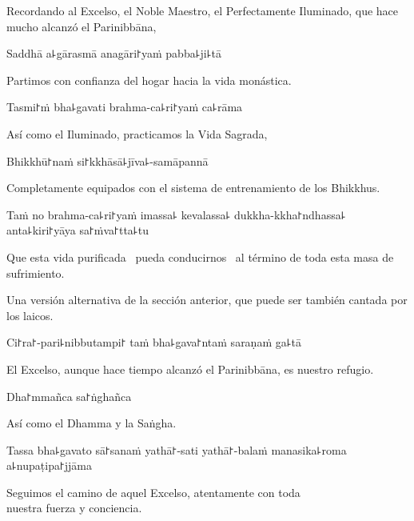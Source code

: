 \begin{english}
  Recordando al Excelso, el Noble Maestro, el Perfectamente Iluminado, que hace mucho alcanzó el Parinibbāna,
\end{english}

Saddhā a꜕gārasmā anagāri꜓yaṁ pabba꜕ji꜕tā

\begin{english}
  Partimos con confianza del hogar hacia la vida monástica.
\end{english}

Tasmi꜓ṁ bha꜕gavati brahma-ca꜕ri꜓yaṁ ca꜕rāma

\begin{english}
  Así como el Iluminado, practicamos la Vida Sagrada,
\end{english}

Bhikkhū꜓naṁ si꜓kkhāsā꜕jīva꜕-samāpannā

\begin{english}
  Completamente equipados con el sistema de entrenamiento de los Bhikkhus.
\end{english}

\clearpage

Taṁ no brahma-ca꜕ri꜓yaṁ imassa꜕ kevalassa꜕ dukkha-kkha꜓ndhassa꜕ anta꜕kiri꜓yāya sa꜓ṁva꜓tta꜕tu

\begin{english}
  Que esta vida purificada \pause\ pueda conducirnos \pause\ al término de toda esta masa de sufrimiento.
\end{english}

\begin{instruction}
  Una versión alternativa de la sección anterior, que puede ser también cantada por los laicos.
\end{instruction}

Ci꜓ra꜓-pari꜕nibbutampi꜓ taṁ bha꜕gava꜓ntaṁ saraṇaṁ ga꜕tā

\begin{english}
  El Excelso, aunque hace tiempo alcanzó el Parinibbāna, es nuestro refugio.
\end{english}

Dha꜓mmañca sa꜓ṅghañca

\begin{english}
  Así como el Dhamma y la Saṅgha.
\end{english}

Tassa bha꜕gavato sā꜓sanaṁ yathā꜓-sati yathā꜓-balaṁ manasika꜕roma a꜕nupaṭipa꜓jjāma

\begin{english}
  Seguimos el camino de aquel Excelso, atentamente con toda\\ nuestra fuerza y conciencia.
\end{english}

